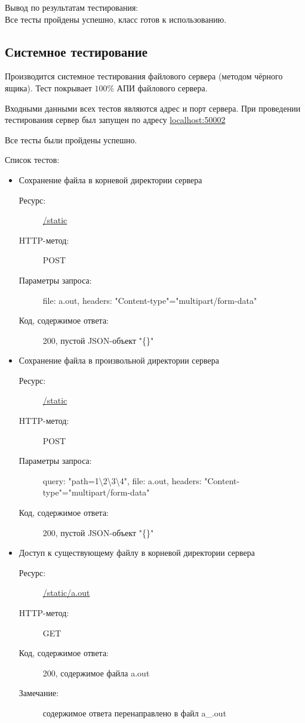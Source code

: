 \documentclass[a4paper,12pt]{report}
\numberwithin{equation}{section}
\begin{document}
Вывод по результатам тестирования:\\
Все тесты пройдены успешно, класс готов к использованию.

\clearpage
\subsection{Системное тестирование}
Производится системное тестирования файлового сервера (методом чёрного ящика).
Тест покрывает $100\%$ АПИ файлового сервера.

Входными данными всех тестов являются адрес и порт сервера.
При проведении тестирования сервер был запущен по адресу \url{localhost:50002}

Все тесты были пройдены успешно.

Список тестов:

\begin{itemize}
  \item Сохранение файла в корневой директории сервера
  \begin{description}
    \item[Ресурс:] \url{/static}
    \item[HTTP-метод:] POST
    \item[Параметры запроса:] file: a.out, headers: "Content-type"="multipart/form-data"
    \item[Код, содержимое ответа:] 200, пустой JSON-объект "\{\}"
  \end{description}
  
  \item Сохранение файла в произвольной директории сервера
  \begin{description}
    \item[Ресурс:] \url{/static}
    \item[HTTP-метод:] POST
    \item[Параметры запроса:] query: "path=1\textbackslash 2\textbackslash 3\textbackslash4", file: a.out, headers: "Content-type"="multipart/form-data"
    \item[Код, содержимое ответа:] 200, пустой JSON-объект "\{\}"
  \end{description}
  
  \item Доступ к существующему файлу в корневой директории сервера
  \begin{description}
    \item[Ресурс:] \url{/static/a.out}
    \item[HTTP-метод:] GET
    \item[Код, содержимое ответа:] 200, содержимое файла a.out
    \item[Замечание:] содержимое ответа перенаправлено в файл a\_.out
  \end{description}
  

\end{itemize}
\end{document}
